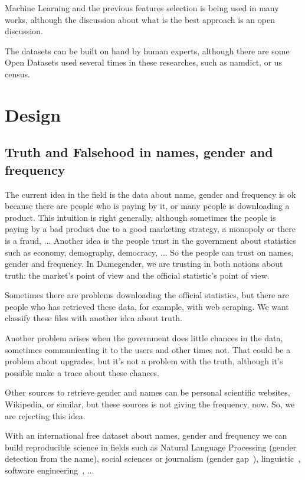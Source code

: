 \documentclass[a4paper]{article}
\begin{document}
Machine Learning and the previous features selection is being used in
many works, although the discussion about what is the best approach is
an open discussion.

The datasets can be built on hand by human experts, although there are
some Open Datasets used several times in these researches, such as
namdict, or us census.

\section{Design}
\label{sec:design}

\subsection{Truth and Falsehood in names, gender and frequency}
\label{sec:truthandfalsehood}

The current idea in the field is the data about name, gender and
frequency is ok because there are people who is paying by it, or many
people is downloading a product. This intuition is right generally,
although sometimes the people is paying by a bad product due to a good
marketing strategy, a monopoly or there is a fraud, ... Another idea
is the people trust in the government about statistics such as economy,
demography, democracy, ... So the people can trust on names, gender
and frequency. In Damegender, we are trusting in both notions about
truth: the market's point of view and the official statistic's
point of view.

Sometimes there are problems downloading the official statistics, but
there are people who has retrieved these data, for example, with
web scraping. We want classify these files with another idea about
truth.

Another problem arises when the government does little chances in the
data, sometimes communicating it to the users and other times
not. That could be a problem about upgrades, but it's not a problem
with the truth, although it's possible make a trace about these
chances.

Other sources to retrieve gender and names can be personal
scientific websites, Wikipedia, or similar, but these sources is not
giving the frequency, now. So, we are rejecting this idea.

With an international free dataset about names, gender and frequency
we can build reproducible science in fields such as Natural Language
Processing (gender detection from the name), social sciences or
journalism (gender
gap~\cite{holman2018gender,mislove2011understanding,niemi2017gendered,de2014genero}),
linguistic~\cite{lawson2005russian,krueger1962mongolian,van2020gender,agyekum2006sociolinguistic,fraser1987lexicon},
software engineering~\cite{vasilescu2012gender}, ...
\end{document}
